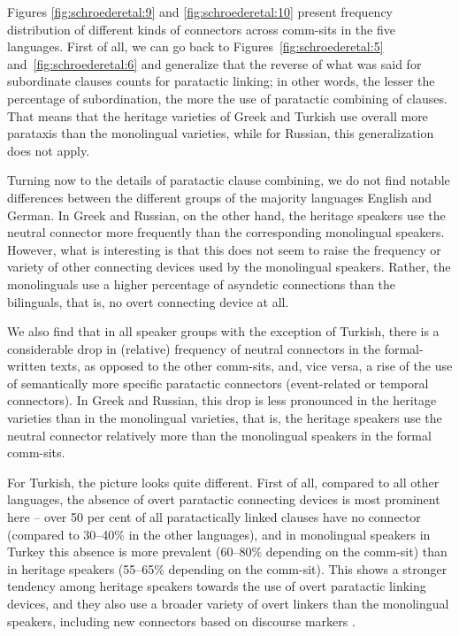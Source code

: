 \documentclass[output=paper,colorlinks,citecolor=brown]{langscibook}
\begin{document}
Figures \ref{fig:schroederetal:9} and \ref{fig:schroederetal:10} present frequency distribution of different kinds of connectors across comm-sits in the five languages. First of all, we can go back to Figures~\ref{fig:schroederetal:5} and~\ref{fig:schroederetal:6} and generalize that the reverse of what was said for subordinate clauses counts for paratactic linking; in other words, the lesser the percentage of subordination, the more the use of paratactic combining of clauses. That means that the heritage varieties of Greek and Turkish use overall more parataxis than the monolingual varieties, while for Russian, this generalization does not apply. 

Turning now to the details of paratactic clause combining, we do not find notable differences between the different groups of the majority languages English and German. In Greek and Russian, on the other hand, the heritage speakers use the neutral connector more frequently than the corresponding monolingual speakers. However, what is interesting is that this does not seem to raise the frequency or variety of other connecting devices used by the monolingual speakers. Rather, the monolinguals use a higher percentage of asyndetic connections than the bilinguals, that is, no overt connecting device at all. 

We also find that in all speaker groups with the exception of Turkish, there is a considerable drop in (relative) frequency of neutral connectors in the formal-written texts, as opposed to the other comm-sits, and, vice versa, a rise of the use of semantically more specific paratactic connectors (event-related or temporal connectors). In Greek and Russian, this drop is less pronounced in the heritage varieties than in the monolingual varieties, that is, the heritage speakers use the neutral connector relatively more than the monolingual speakers in the formal comm-sits.

For Turkish, the picture looks quite different. First of all, compared to all other languages, the absence of overt paratactic connecting devices is most prominent here – over 50 per cent of all paratactically linked clauses have no connector (compared to 30--40\% in the other languages), and in monolingual speakers in Turkey this absence is more prevalent (60--80\% depending on the comm-sit) than in heritage speakers (55--65\% depending on the comm-sit). This shows a stronger tendency among heritage speakers towards the use of overt paratactic linking devices, and they also use a broader variety of overt linkers than the monolingual speakers, including new connectors based on discourse markers \parencite{chapters/14}.
\pagebreak
\end{document}
